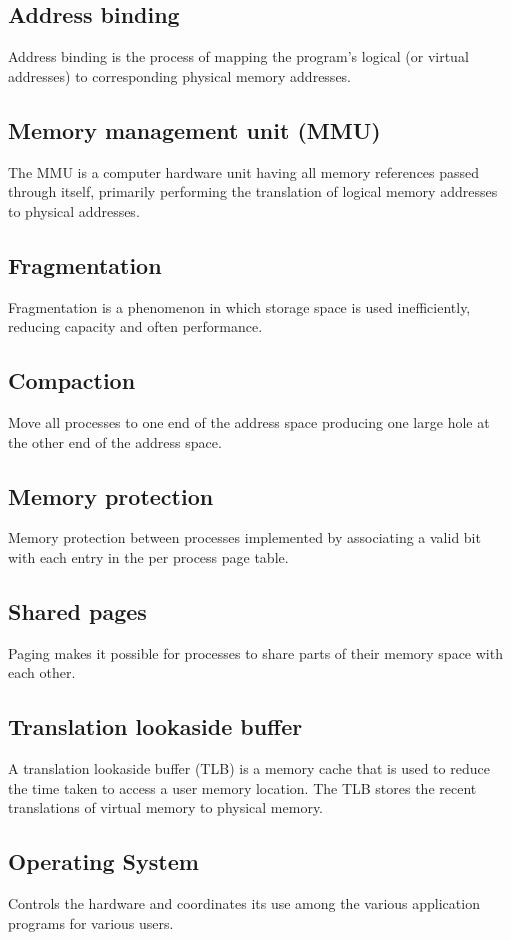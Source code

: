 \begin{multicols}{2}
\subsection{Address binding}
Address binding is the process of mapping
the program's logical (or virtual addresses)
to corresponding physical memory
addresses.

\subsection{Memory management unit (MMU)}
 The MMU is a computer hardware unit having
all memory references passed through itself,
primarily performing the translation of logical
memory addresses to physical addresses.

\subsection{Fragmentation}
Fragmentation is a phenomenon in which
storage space is used inefficiently, reducing
capacity and often performance.

\subsection{Compaction}
Move all processes to one end of the address
space producing one large hole at the other
end of the address space.

\subsection{Memory protection}
Memory protection between
processes implemented by
associating a valid bit with each
entry in the per process page table.

\subsection{Shared pages}
Paging makes it possible for
processes to share parts of their
memory space with each other.

\subsection{Translation lookaside buffer}
A translation lookaside buffer (TLB) is a
memory cache that is used to reduce the time
taken to access a user memory location.
The TLB stores the recent translations of virtual memory to physical memory.

\subsection{Operating System}
Controls the hardware and
coordinates its use among the
various application programs for various users.


\end{multicols}
